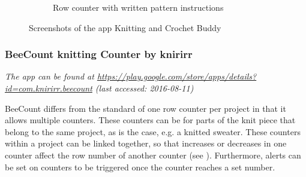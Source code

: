 \begin{figure}[H]
\begin{subfigure}[b]{0.33\textwidth}
        \caption[Row counter with written pattern instructions ]{Row counter with written pattern instructions}
    \end{subfigure}
  \caption[Screenshots of the app Knitting and Crochet Buddy ]{Screenshots of the app Knitting and Crochet Buddy}
\end{figure}

\subsubsection*{BeeCount knitting Counter by knirirr}

\textit{ The app can be found at \url{https://play.google.com/store/apps/details?id=com.knirirr.beecount} \small{(last accessed: 2016-08-11)}}
\vspace*{0.5cm}

\noindent BeeCount differs from the standard of one row counter per project in that it allows multiple counters. These counters can be for parts of the knit piece that  belong to the same project, as is the case, e.g. a knitted sweater. These counters within a project can be linked together, so that increases or decreases in one counter affect the row number of another counter (see ). Furthermore, alerts can be set on counters to be triggered once the counter
reaches a set number.

